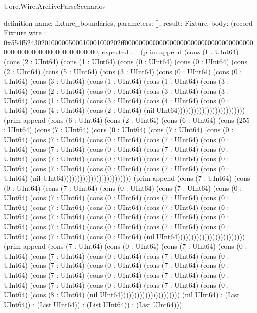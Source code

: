 \begin{lexlean}{Uorc.Wire.ArchiveParseScenarios}
\begin{semanticmodule}
definition{
  name: fixture_boundaries,
  parameters: [],
  result: Fixture,
  body: (record Fixture {wire := 0x554f5243020100000500010001000202ff0000000000000000000000000000000000000000000000000000000000000000, expected := (prim append (cons (1 : UInt64) (cons (2 : UInt64) (cons (1 : UInt64) (cons (0 : UInt64) (cons (0 : UInt64) (cons (2 : UInt64) (cons (5 : UInt64) (cons (3 : UInt64) (cons (0 : UInt64) (cons (0 : UInt64) (cons (3 : UInt64) (cons (1 : UInt64) (cons (1 : UInt64) (cons (3 : UInt64) (cons (2 : UInt64) (cons (0 : UInt64) (cons (3 : UInt64) (cons (3 : UInt64) (cons (1 : UInt64) (cons (3 : UInt64) (cons (4 : UInt64) (cons (0 : UInt64) (cons (4 : UInt64) (cons (2 : UInt64) (nil UInt64))))))))))))))))))))))))) (prim append (cons (6 : UInt64) (cons (2 : UInt64) (cons (6 : UInt64) (cons (255 : UInt64) (cons (7 : UInt64) (cons (0 : UInt64) (cons (7 : UInt64) (cons (0 : UInt64) (cons (7 : UInt64) (cons (0 : UInt64) (cons (7 : UInt64) (cons (0 : UInt64) (cons (7 : UInt64) (cons (0 : UInt64) (cons (7 : UInt64) (cons (0 : UInt64) (cons (7 : UInt64) (cons (0 : UInt64) (cons (7 : UInt64) (cons (0 : UInt64) (cons (7 : UInt64) (cons (0 : UInt64) (cons (7 : UInt64) (cons (0 : UInt64) (nil UInt64))))))))))))))))))))))))) (prim append (cons (7 : UInt64) (cons (0 : UInt64) (cons (7 : UInt64) (cons (0 : UInt64) (cons (7 : UInt64) (cons (0 : UInt64) (cons (7 : UInt64) (cons (0 : UInt64) (cons (7 : UInt64) (cons (0 : UInt64) (cons (7 : UInt64) (cons (0 : UInt64) (cons (7 : UInt64) (cons (0 : UInt64) (cons (7 : UInt64) (cons (0 : UInt64) (cons (7 : UInt64) (cons (0 : UInt64) (cons (7 : UInt64) (cons (0 : UInt64) (cons (7 : UInt64) (cons (0 : UInt64) (cons (7 : UInt64) (cons (0 : UInt64) (nil UInt64))))))))))))))))))))))))) (prim append (cons (7 : UInt64) (cons (0 : UInt64) (cons (7 : UInt64) (cons (0 : UInt64) (cons (7 : UInt64) (cons (0 : UInt64) (cons (7 : UInt64) (cons (0 : UInt64) (cons (7 : UInt64) (cons (0 : UInt64) (cons (7 : UInt64) (cons (0 : UInt64) (cons (7 : UInt64) (cons (0 : UInt64) (cons (7 : UInt64) (cons (0 : UInt64) (cons (7 : UInt64) (cons (0 : UInt64) (cons (7 : UInt64) (cons (0 : UInt64) (cons (8 : UInt64) (nil UInt64)))))))))))))))))))))) (nil UInt64) : (List UInt64)) : (List UInt64)) : (List UInt64)) : (List UInt64))})
}


\end{semanticmodule}
\end{lexlean}
